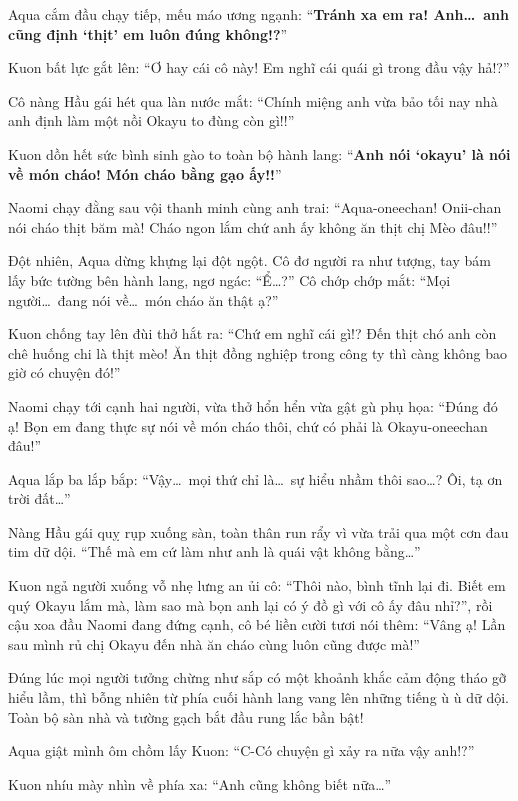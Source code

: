 \documentclass[../main.tex]{subfiles}
\begin{document}
Aqua cắm đầu chạy tiếp, mếu máo ương ngạnh: ``\textbf{Tránh xa em ra! Anh\dots\ anh cũng định `thịt' em luôn đúng không!?}''

Kuon bất lực gắt lên: ``Ơ hay cái cô này! Em nghĩ cái quái gì trong đầu vậy hả!?''

Cô nàng Hầu gái hét qua làn nước mắt: ``Chính miệng anh vừa bảo tối nay nhà anh định làm một nồi Okayu to đùng còn gì!!''

Kuon dồn hết sức bình sinh gào to toàn bộ hành lang: ``\textbf{Anh nói `okayu' là nói về món cháo! Món cháo bằng gạo ấy!!}''

Naomi chạy đằng sau vội thanh minh cùng anh trai: ``Aqua-oneechan! Onii-chan nói cháo thịt băm mà! Cháo ngon lắm chứ anh ấy không ăn thịt chị Mèo đâu!!''

Đột nhiên, Aqua dừng khựng lại đột ngột. Cô đơ người ra như tượng, tay bám lấy bức tường bên hành lang, ngơ ngác: ``Ể\dots?'' Cô chớp chớp mắt: ``Mọi người\dots\ đang nói về\dots\ món cháo ăn thật ạ?''

Kuon chống tay lên đùi thở hắt ra: ``Chứ em nghĩ cái gì!? Đến thịt chó anh còn chê huống chi là thịt mèo! Ăn thịt đồng nghiệp trong công ty thì càng không bao giờ có chuyện đó!''

Naomi chạy tới cạnh hai người, vừa thở hổn hển vừa gật gù phụ họa: ``Đúng đó ạ! Bọn em đang thực sự nói về món cháo thôi, chứ có phải là Okayu-oneechan đâu!''

Aqua lắp ba lắp bắp: ``Vậy\dots\ mọi thứ chỉ là\dots\ sự hiểu nhầm thôi sao\dots? Ôi, tạ ơn trời đất\dots''

Nàng Hầu gái quỵ rụp xuống sàn, toàn thân run rẩy vì vừa trải qua một cơn đau tim dữ dội. ``Thế mà em cứ làm như anh là quái vật không bằng\dots''

Kuon ngả người xuống vỗ nhẹ lưng an ủi cô: ``Thôi nào, bình tĩnh lại đi. Biết em quý Okayu lắm mà, làm sao mà bọn anh lại có ý đồ gì với cô ấy đâu nhỉ?'', rồi cậu xoa đầu Naomi đang đứng cạnh, cô bé liền cười tươi nói thêm: ``Vâng ạ! Lần sau mình rủ chị Okayu đến nhà ăn cháo cùng luôn cũng được mà!''

Đúng lúc mọi người tưởng chừng như sắp có một khoảnh khắc cảm động tháo gỡ hiểu lầm, thì bỗng nhiên từ phía cuối hành lang vang lên những tiếng ù ù dữ dội. Toàn bộ sàn nhà và tường gạch bắt đầu rung lắc bần bật!

Aqua giật mình ôm chồm lấy Kuon: ``C-Có chuyện gì xảy ra nữa vậy anh!?''

Kuon nhíu mày nhìn về phía xa: ``Anh cũng không biết nữa\dots''
\end{document}

